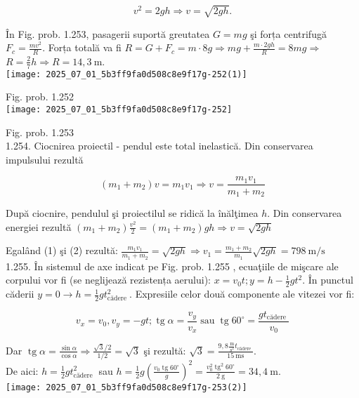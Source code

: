 $$
v^{2}=2 g h \Rightarrow v=\sqrt{2 g h} .
$$

În Fig. prob. 1.253, pasagerii suportă greutatea $G=m g$ şi forța centrifugă $F_{c}=\frac{m v^{2}}{R}$. Forța totală va fi $R=G+F_{c}=m \cdot 8 g \Rightarrow m g+\frac{m \cdot 2 g h}{R}=8 m g \Rightarrow$ $R=\frac{2}{7} h \Rightarrow R=14,3 \mathrm{~m}$.\\
\texttt{[image: 2025\_07\_01\_5b3ff9fa0d508c8e9f17g-252(1)]}

Fig. prob. 1.252\\
\texttt{[image: 2025\_07\_01\_5b3ff9fa0d508c8e9f17g-252]}

Fig. prob. 1.253\\
1.254. Ciocnirea proiectil - pendul este total inelastică. Din conservarea impulsului rezultă


\begin{equation*}
\left(m_{1}+m_{2}\right) v=m_{1} v_{1} \Rightarrow v=\frac{m_{1} v_{1}}{m_{1}+m_{2}} \tag{1}
\end{equation*}

După ciocnire, pendulul şi proiectilul se ridică la înălţimea $h$. Din conservarea energiei rezultă $\left(m_{1}+m_{2}\right) \frac{v^{2}}{2}=\left(m_{1}+m_{2}\right) g h \Rightarrow v=\sqrt{2 g h}$

Egalând (1) şi (2) rezultă: $\frac{m_{1} v_{1}}{m_{1}+m_{2}}=\sqrt{2 g h} \Rightarrow v_{1}=\frac{m_{1}+m_{2}}{m_{1}} \sqrt{2 g h}=798 \mathrm{~m} / \mathrm{s}$\\
1.255. În sistemul de axe indicat pe Fig. prob. 1.255 , ecuaţiile de mişcare ale corpului vor fi (se neglijează rezistența aerului): $x=v_{0} t ; y=h-\frac{1}{2} g t^{2}$. În punctul căderii $y=0 \rightarrow h=\frac{1}{2} g t_{\text {cădere }}^{2}$. Expresiile celor două componente ale vitezei vor fi:

$$
v_{x}=v_{0}, v_{y}=-g t ; \operatorname{tg} \alpha=\frac{v_{y}}{v_{x}} \operatorname{sau} \operatorname{tg} 60^{\circ}=\frac{g t_{\text {cădere }}}{v_{0}}
$$

Dar $\operatorname{tg} \alpha=\frac{\sin \alpha}{\cos \alpha} \Rightarrow \frac{\sqrt{3} / 2}{1 / 2}=\sqrt{3}$ şi rezultă: $\sqrt{3}=\frac{9,8 \frac{\mathrm{~m}}{\mathrm{~s}^{2}} t_{\text {cădere }}}{15 \mathrm{~ms}}$.\\
De aici: $h=\frac{1}{2} g t_{\text {cădere }}^{2}$ sau $h=\frac{1}{2} g\left(\frac{v_{0} \operatorname{tg} 60^{\circ}}{g}\right)^{2}=\frac{v_{0}^{2} \operatorname{tg}^{2} 60^{\circ}}{2 \mathrm{~g}}=34,4 \mathrm{~m}$.\\
\texttt{[image: 2025\_07\_01\_5b3ff9fa0d508c8e9f17g-253(2)]}


